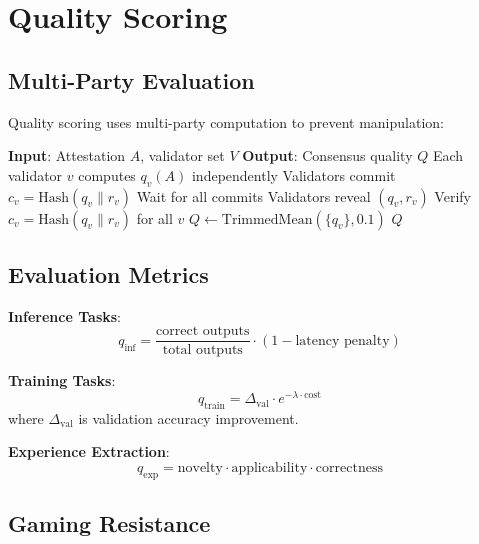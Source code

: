 \documentclass[11pt,letterpaper]{article}
\begin{document}
\section{Quality Scoring}
\label{sec:quality}

\subsection{Multi-Party Evaluation}

Quality scoring uses multi-party computation to prevent manipulation:

\begin{algorithm}[t]
\caption{Multi-Party Quality Evaluation}
\label{alg:mpe}
\begin{algorithmic}[1]
\STATE \textbf{Input}: Attestation $A$, validator set $V$
\STATE \textbf{Output}: Consensus quality $Q$
\STATE Each validator $v$ computes $q_v(A)$ independently
\STATE Validators commit $c_v = \text{Hash}(q_v \| r_v)$
\STATE Wait for all commits
\STATE Validators reveal $(q_v, r_v)$
\STATE Verify $c_v = \text{Hash}(q_v \| r_v)$ for all $v$
\STATE $Q \leftarrow \text{TrimmedMean}(\{q_v\}, 0.1)$
\RETURN $Q$
\end{algorithmic}
\end{algorithm}

\subsection{Evaluation Metrics}

\textbf{Inference Tasks}:
\begin{equation}
q_{\text{inf}} = \frac{\text{correct outputs}}{\text{total outputs}} \cdot (1 - \text{latency penalty})
\end{equation}

\textbf{Training Tasks}:
\begin{equation}
q_{\text{train}} = \Delta_{\text{val}} \cdot e^{-\lambda \cdot \text{cost}}
\end{equation}
where $\Delta_{\text{val}}$ is validation accuracy improvement.

\textbf{Experience Extraction}:
\begin{equation}
q_{\text{exp}} = \text{novelty} \cdot \text{applicability} \cdot \text{correctness}
\end{equation}

\subsection{Gaming Resistance}
\end{document}
